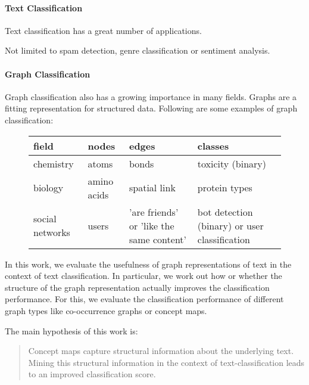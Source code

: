 
\paragraph{Text Classification}
Text classification has a great number of applications.

Not limited to spam detection, genre classification or sentiment analysis.

\paragraph{Graph Classification}
Graph classification also has a growing importance in many fields. Graphs are a fitting representation for structured data. Following are some examples of graph classification:

\begin{figure}[h]
\centering
\begin{tabular}{llll}
field &  nodes &  edges & classes\\
\midrule
chemistry & atoms & bonds & toxicity (binary)\\
biology & amino acids & spatial link & protein types \\ 
social networks & users & 'are friends' or 'like the same content' & bot detection (binary) or user classification
\end{tabular}
\end{figure}

In this work, we evaluate the usefulness of graph representations of text in the context of text classification. In particular, we work out how or whether the structure of the graph representation actually improves the classification performance.
For this, we evaluate the classification performance of different graph types like co-occurrence graphs or concept maps.

The main hypothesis of this work is:
\begin{quote}
Concept maps capture structural information about the underlying text. Mining this structural information in the context of text-classification leads to an improved classification score.
\end{quote}

